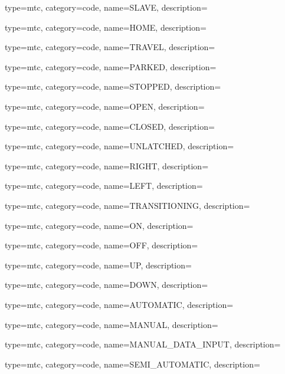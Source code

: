 {
  type=mtc,
  category=code,
  name={SLAVE},
  description={}
}

{
  type=mtc,
  category=code,
  name={HOME},
  description={}
}

{
  type=mtc,
  category=code,
  name={TRAVEL},
  description={}
}

{
  type=mtc,
  category=code,
  name={PARKED},
  description={}
}

{
  type=mtc,
  category=code,
  name={STOPPED},
  description={}
}

{
  type=mtc,
  category=code,
  name={OPEN},
  description={}
}

{
  type=mtc,
  category=code,
  name={CLOSED},
  description={}
}

{
  type=mtc,
  category=code,
  name={UNLATCHED},
  description={}
}


{
  type=mtc,
  category=code,
  name={RIGHT},
  description={}
}

{
  type=mtc,
  category=code,
  name={LEFT},
  description={}
}

{
  type=mtc,
  category=code,
  name={TRANSITIONING},
  description={}
}

{
  type=mtc,
  category=code,
  name={ON},
  description={}
}

{
  type=mtc,
  category=code,
  name={OFF},
  description={}
}

{
  type=mtc,
  category=code,
  name={UP},
  description={}
}

{
  type=mtc,
  category=code,
  name={DOWN},
  description={}
}

{
  type=mtc,
  category=code,
  name={AUTOMATIC},
  description={}
}

{
  type=mtc,
  category=code,
  name={MANUAL},
  description={}
}

{
  type=mtc,
  category=code,
  name={MANUAL\_DATA\_INPUT},
  description={}
}

{
  type=mtc,
  category=code,
  name={SEMI\_AUTOMATIC},
  description={}
}

